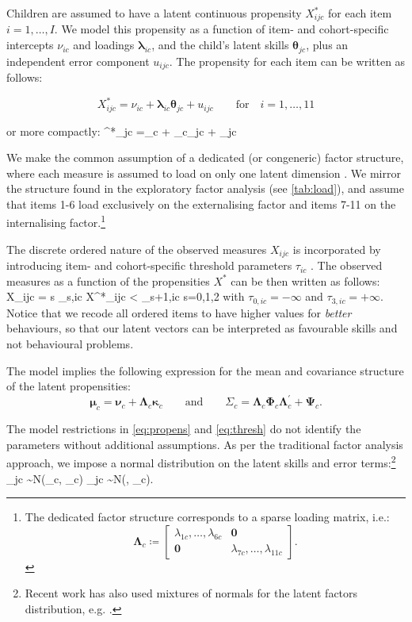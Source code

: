 Children are assumed to have a latent continuous propensity $X^*_{ijc}$ for each item $i=1,\dots,I$. We model this propensity as a function of item- and cohort-specific intercepts $\nu_{ic}$ and loadings $\bm{\lambda}_{ic}$, and the child's latent skills $\bm{\theta}_{jc}$, plus an independent error component $u_{ijc}$. The propensity for each item can be written as follows:

$$X^*_{ijc} =\nu_{ic} + \bm{\lambda}_{ic}\bm{\theta}_{jc} + u_{ijc} \qquad \text{for} \quad i = 1,\dots,11$$

or more compactly:
\be\label{eq:propens}
^*_{jc} =\bm{\nu}_c + \bm{\Lambda}_{c}\bm{\theta}_{jc} + _{jc}
\ee

We make the common assumption of a dedicated (or congeneric) factor structure, where each measure is assumed to load on only one latent dimension \citep{Heckman2013,Conti2010a,Attanasio2018a}. We mirror the structure found in the exploratory factor analysis (see \autoref{tab:load}), and assume that items 1-6 load exclusively on the externalising factor and items 7-11 on the internalising factor.\footnote{The dedicated factor structure corresponds to a sparse loading matrix, i.e.: $$\bm{\Lambda}_{c} \coloneqq \begin{bmatrix} \lambda_{1c}, \dots, \lambda_{6c} & \bm{0} \\ \bm{0} & \lambda_{7c}, \dots, \lambda_{11c} \end{bmatrix}.$$}

The discrete ordered nature of the observed measures $X_{ijc}$ is incorporated by introducing item- and cohort-specific threshold parameters $\tau_{ic}$ \citep{Muthen1984}. The observed measures as a function of the propensities $X^*$ can be then written as follows:
\be\label{eq:thresh}
X_{ijc} = s \qquad {} \; \tau_{s,ic} \leq X^*_{ijc} < \tau_{s+1,ic} \qquad {} \; s=0,1,2
\ee
with $\tau_{0,ic}=-\infty$ and $\tau_{3,ic}=+\infty$. Notice that we recode all ordered items to have higher values for \emph{better} behaviours, so that our latent vectors can be interpreted as favourable skills and not behavioural problems.

The model implies the following expression for the mean and covariance structure of the latent propensities:
$$\bm{\mu}_c=\bm{\nu}_c + \bm{\Lambda}_c\bm{\kappa}_c \qquad \text{and} \qquad \Sigma_c = \bm{\Lambda}_c \bm{\Phi}_c \bm{\Lambda}_c^\prime + \bm{\Psi}_c.$$

The model restrictions in \eqref{eq:propens} and \eqref{eq:thresh} do not identify the parameters without additional assumptions. As per the traditional factor analysis approach, we impose a normal distribution on the latent skills and error terms:\footnote{Recent work has also used mixtures of normals for the latent factors distribution, e.g. \citet{Conti2010a}.}
\be\label{eq:norm}
\bm{\theta}_{jc} \sim N(\bm{\kappa}_c, \bm{\Phi}_c) \qquad {} \qquad {}_{jc} \sim N(, \bm{\Psi}_c).
\ee

